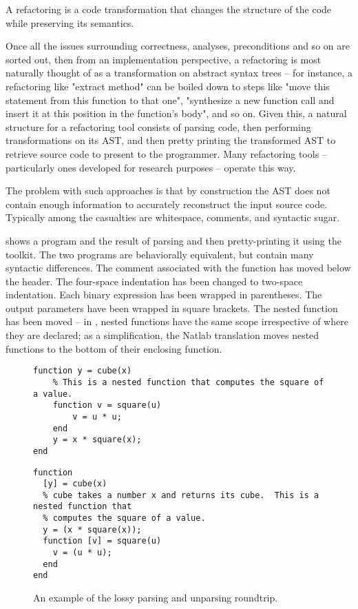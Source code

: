 A refactoring is a code transformation that changes the structure of the code
while preserving its semantics.

Once all the issues surrounding correctness, analyses, preconditions and so on
are sorted out, then from an implementation perspective, a refactoring is most
naturally thought of as a transformation on abstract syntax trees -- for
instance, a refactoring like "extract method" can be boiled down to steps like
"move this statement from this function to that one", "synthesize a new
function call and insert it at this position in the function's body", and so
on. Given this, a natural structure for a refactoring tool consists of parsing
code, then performing transformations on its AST, and then pretty printing the
transformed AST to retrieve source code to present to the programmer. Many
refactoring tools -- particularly ones developed for research purposes --
operate this way.

The problem with such approaches is that by construction the AST does not
contain enough information to accurately reconstruct the input source code.
Typically among the casualties are whitespace, comments, and syntactic sugar.

 shows a \matlab program and the result of parsing and
then pretty-printing it using the \mclab toolkit. The two programs are
behaviorally equivalent, but contain many syntactic differences. The comment
associated with the  function has moved below the header. The
four-space indentation has been changed to two-space indentation. Each binary
expression has been wrapped in parentheses.  The output parameters have been
wrapped in square brackets.  The nested function  has been moved
-- in \matlab, nested functions have the same scope irrespective of where they
are declared; as a simplification, the Natlab translation moves nested
functions to the bottom of their enclosing function.

\begin{figure}
\begin{minipage}{0.5\linewidth}
\begin{lstlisting}[numbers=none]
% cube takes a number x and returns its cube.
function y = cube(x)
    % This is a nested function that computes the square of a value.
    function v = square(u)
        v = u * u;
    end
    y = x * square(x);
end
\end{lstlisting}
\end{minipage}
\hfill \hspace{.3cm} \hfill
\begin{minipage}{0.5\linewidth}
\begin{lstlisting}[numbers=none]
function
  [y] = cube(x)
  % cube takes a number x and returns its cube.  This is a nested function that
  % computes the square of a value.
  y = (x * square(x));
  function [v] = square(u)
    v = (u * u);
  end
end
\end{lstlisting}
\end{minipage}
\caption{An example of the lossy parsing and unparsing roundtrip.}
\label{Fig:LostLayout}
\end{figure}

